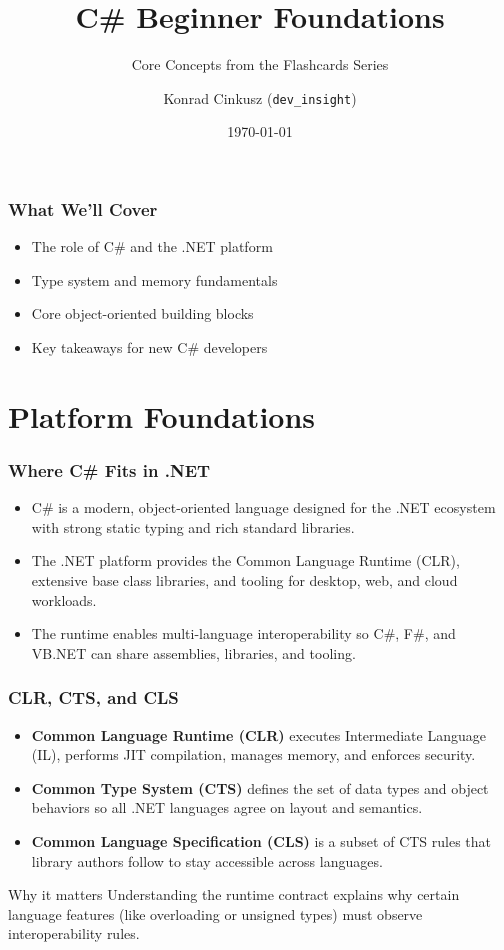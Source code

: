 \documentclass[aspectratio=169]{beamer}
\title[C# Beginner Foundations]{C\# Beginner Foundations}
\subtitle{Core Concepts from the Flashcards Series}
\author[\href{https://github.com/konradcinkusz}{konradcinkusz \;|\; github.com/konradcinkusz}]{Konrad Cinkusz (\texttt{dev\_insight})}
\institute{C\# Flashcards Learning Path}
\date{\today}
\newcommand{\ProgressStep}[1]{\progressstep{#1}}
\newcommand{\ThisFrameTitle}[1]{\frametitle{#1}}
\begin{document}
\begin{frame}
  \ProgressStep{-1}\ThisFrameTitle{}
  \titlepage
\end{frame}

\begin{frame}
  \ProgressStep{-1}\ThisFrameTitle{What We'll Cover}
  \begin{itemize}
    \item The role of C\# and the .NET platform
    \item Type system and memory fundamentals
    \item Core object-oriented building blocks
    \item Key takeaways for new C\# developers
  \end{itemize}
\end{frame}

\section{Platform Foundations}
\begin{frame}
  \ProgressStep{0}\ThisFrameTitle{Where C\# Fits in .NET}
  \begin{itemize}
    \item C\# is a modern, object-oriented language designed for the .NET ecosystem with strong static typing and rich standard libraries.
    \item The .NET platform provides the Common Language Runtime (CLR), extensive base class libraries, and tooling for desktop, web, and cloud workloads.
    \item The runtime enables multi-language interoperability so C\#, F\#, and VB.NET can share assemblies, libraries, and tooling.
  \end{itemize}
\end{frame}

\begin{frame}
  \ProgressStep{1}\ThisFrameTitle{CLR, CTS, and CLS}
  \begin{itemize}
    \item \textbf{Common Language Runtime (CLR)} executes Intermediate Language (IL), performs JIT compilation, manages memory, and enforces security.
    \item \textbf{Common Type System (CTS)} defines the set of data types and object behaviors so all .NET languages agree on layout and semantics.
    \item \textbf{Common Language Specification (CLS)} is a subset of CTS rules that library authors follow to stay accessible across languages.
  \end{itemize}
  \vspace{0.6em}
  \begin{block}{Why it matters}
    Understanding the runtime contract explains why certain language features (like overloading or unsigned types) must observe interoperability rules.
  \end{block}
\end{frame}
\end{document}
